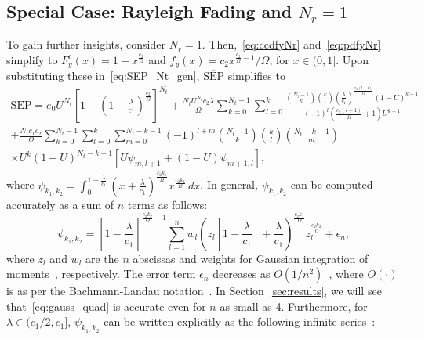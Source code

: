 \documentclass[12pt,draftcls,peerreview,onecolumn]{IEEEtran}
\newcommand{\SEP}{\text{SEP}}
\newcommand{\nck}[2]{\binom{#1}{#2}}
\newcommand{\lam}{\lambda}
\newcommand{\error}{\epsilon_n}
\newcommand{\Nt}{{N_t}}
\newcommand{\Nr}{{N_r}}
\newcommand{\cone}{c_{1}}
\newcommand{\ctwo}{c_{2}}
\newcommand{\lambym}{\frac{\lam}{\cone}}
\newcommand{\al}{\ctwo}
\newcommand{\snr}{\Omega}
\newcommand{\albysnr}[1][]{\frac{\al#1}{\snr}}
\newcommand{\un}{U}
\newcommand{\psifun}[2]{\psi_{{#1},{#2}}}
\newcommand{\onemlc}{\left[1-\lambym\right]}
\newcommand{\zerosep}{e_0}
\newcommand{\avgSEP}{\overline{\SEP}}
\begin{document}
\subsection{Special Case: Rayleigh Fading and $\Nr=1$} 
To gain further insights, consider $\Nr = 1$. Then,~\eqref{eq:ccdfyNr} and~\eqref{eq:pdfyNr} simplify to $F_{y}^{c}(x) = 1-x^{\albysnr}$ and $f_{y}(x) = \al x^{\albysnr-1}/\snr$, for $x \in (0,1]$. Upon substituting these in~\eqref{eq:SEP_Nt_gen}, $\avgSEP$ simplifies to 
%
\newcommand{\lidx}{l}
\newcommand{\midx}{m}
\begin{multline}
\label{eq:avgSEPoneNr} 
\avgSEP =\zerosep\un^{\Nt}\!\left[1-\left(1-\lambym\right)^{\!\albysnr[]}\right]^{\Nt}
+ \frac{\Nt\un^{\Nt}\al\lam}{\snr} \sum_{k=0}^{\Nt-1}\sum_{\lidx=0}^{k} \frac{\nck{\Nt-1}{k} \nck{k}{\lidx}\left(\lambym\right)^{\albysnr[(\lidx+1)]}\left(1-\un\right)^{k+1} }{(-1)^{\lidx} \left( \albysnr[(\lidx+1)]+1\right)\un^{k+1} }\\ + \frac{\Nt\cone\al}{\snr} \sum_{k=0}^{\Nt-1} \sum_{\lidx=0}^{k} \sum_{\midx=0}^{\Nt-k-1} (-1)^{\lidx+\midx}  \binom{\Nt-1}{k} \binom{k}{\lidx} \binom{\Nt-k-1}{\midx} \\\times\un^{k} (1-\un)^{\Nt-k-1} \left[ \un\psifun{\midx}{\lidx+1} +  \left(1-\un\right) \psifun{\midx+1}{\lidx} \right]
,
\end{multline}
where $\psifun{k_1}{k_2} = \int_{0}^{1-\frac{\lam}{\cone}} \left(x+\lambym\right)^{\albysnr[k_1]} x^{\albysnr[k_2]} \,dx$.
%
\newcommand{\gqsym}{z_{\lidx}}
\newcommand{\gqwt}{w_{\lidx}}
In general, $\psifun{k_1}{k_2}$ can be computed accurately as a sum of $n$  terms as follows: 
\begin{equation}
\psifun{k_1}{k_2} ={\onemlc^{\albysnr[k_2]+1}} \sum_{\lidx=1}^{n} \gqwt {\left(\!\gqsym\onemlc +\lambym\right)}^{\albysnr[k_1]} \gqsym^{\albysnr[k_2]} + \error,
\label{eq:gauss_quad}
\end{equation}
where $\gqsym$ and $\gqwt$ are the $n$ abscissas and weights for Gaussian integration of moments~\cite[pp. 921-922]{abramowitz_stegun}, respectively. The error term $\error$ decreases as $O(1/n^2)$~\cite{Xiang_2012_SIAM}, where $O(\cdot)$ is as per the Bachmann-Landau notation~\cite[Chap. 3]{CLRS_algo_book}. In Section~\ref{sec:results}, we will see that~\eqref{eq:gauss_quad}  is accurate even for $n$ as small as 4. Furthermore, for $\lam\in({\cone}/{2}, \cone]$, $\psifun{k_1}{k_2}$ can be written explicitly as the following infinite series~\cite{gradshteyn00_book}:
%
\end{document}
